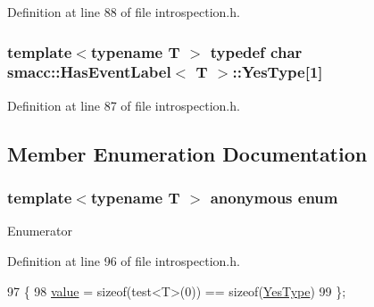 Definition at line 88 of file introspection.\+h.

\subsubsection[{\texorpdfstring{Yes\+Type}{YesType}}]{\setlength{\rightskip}{0pt plus 5cm}template$<$typename T $>$ typedef char {\bf smacc\+::\+Has\+Event\+Label}$<$ T $>$\+::Yes\+Type\mbox{[}1\mbox{]}\hspace{0.3cm}{\ttfamily [private]}}\hypertarget{classsmacc_1_1HasEventLabel_a7baf4f99540d64553d8bba388b77fb25}{}\label{classsmacc_1_1HasEventLabel_a7baf4f99540d64553d8bba388b77fb25}


Definition at line 87 of file introspection.\+h.



\subsection{Member Enumeration Documentation}
\subsubsection[{\texorpdfstring{anonymous enum}{anonymous enum}}]{\setlength{\rightskip}{0pt plus 5cm}template$<$typename T $>$ anonymous enum}\hypertarget{classsmacc_1_1HasEventLabel_a7aa204bcf7a7faf203081f1eaf577bf5}{}\label{classsmacc_1_1HasEventLabel_a7aa204bcf7a7faf203081f1eaf577bf5}
\begin{Desc}
\item[Enumerator]\par
\begin{description}
\item[{\em 
value\hypertarget{classsmacc_1_1HasEventLabel_a7aa204bcf7a7faf203081f1eaf577bf5afb831cdba5590b0dd7a722637b8a1125}{}\label{classsmacc_1_1HasEventLabel_a7aa204bcf7a7faf203081f1eaf577bf5afb831cdba5590b0dd7a722637b8a1125}
}]\end{description}
\end{Desc}


Definition at line 96 of file introspection.\+h.


\begin{DoxyCode}
97     \{
98         \hyperlink{classsmacc_1_1HasEventLabel_a7aa204bcf7a7faf203081f1eaf577bf5afb831cdba5590b0dd7a722637b8a1125}{value} = \textcolor{keyword}{sizeof}(test<T>(0)) == \textcolor{keyword}{sizeof}(\hyperlink{classsmacc_1_1HasEventLabel_a7baf4f99540d64553d8bba388b77fb25}{YesType})
99     \};
\end{DoxyCode}



